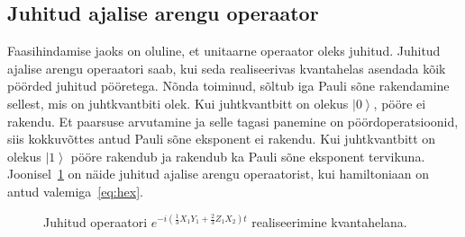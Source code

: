 \documentclass[12pt]{report}
\def\paren#1{\left(#1\right)}
\def\ket#1{\left|#1\right>}
\begin{document}
\subsection{Juhitud ajalise arengu operaator}\label{sec:cu}

Faasihindamise jaoks on oluline, et unitaarne operaator oleks juhitud.
Juhitud ajalise arengu operaatori saab, kui seda realiseerivas kvantahelas asendada kõik pöörded juhitud pööretega.
Nõnda toiminud, sõltub iga Pauli sõne rakendamine sellest, mis on juhtkvantbiti olek.
Kui juhtkvantbitt on olekus \(\ket{0}\), pööre ei rakendu.
Et paarsuse arvutamine ja selle tagasi panemine on pöördoperatsioonid, siis kokkuvõttes antud Pauli sõne eksponent ei rakendu.
Kui juhtkvantbitt on olekus \(\ket{1}\) pööre rakendub ja rakendub ka Pauli sõne eksponent tervikuna.
Joonisel~\ref{fig:trotexctrl} on näide juhitud ajalise arengu operaatorist, kui hamiltoniaan on antud valemiga~\eqref{eq:hex}.

\begin{figure}[h]
    \centering
    \ifdefined\yquanton
    \fi
    \caption{Juhitud operaatori \(e^{-i\paren{\frac{1}{3}X_1Y_1+\frac{2}{3}Z_1X_2} t}\) realiseerimine kvantahelana.}
    \label{fig:trotexctrl}
\end{figure}
\end{document}
